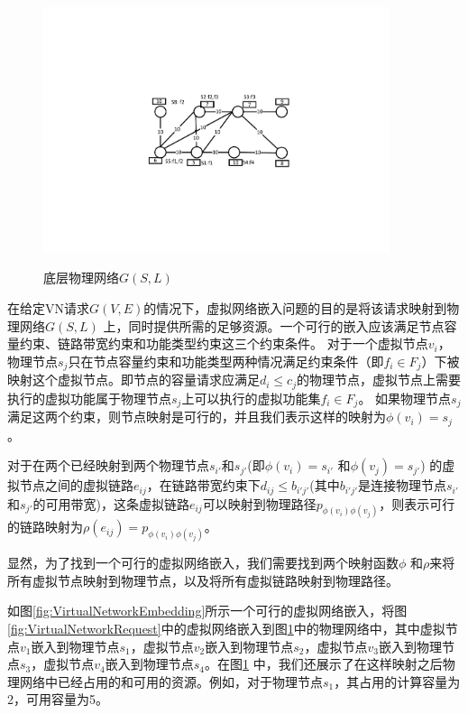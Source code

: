 \begin{figure}[htb]
\centering
\includegraphics[width=4in]{figures/PhysicalNetwork}\\
\caption{底层物理网络$G(S,L)$}\label{fig:PhysicalNetwork}
\end{figure}

在给定VN请求$G (V,E)$的情况下，虚拟网络嵌入问题的目的是将该请求映射到物理网络$G (S,L)$ 上，同时提供所需的足够资源。一个可行的嵌入应该满足节点容量约束、链路带宽约束和功能类型约束这三个约束条件。
对于一个虚拟节点$v_i$，物理节点$s_j$只在节点容量约束和功能类型两种情况满足约束条件（即${f_i} \in {F_j}$）下被映射这个虚拟节点。即节点的容量请求应满足$d_i\leq c_j$的物理节点，虚拟节点上需要执行的虚拟功能属于物理节点$s_j$上可以执行的虚拟功能集${f_i} \in {F_j}$。 如果物理节点$s_j$ 满足这两个约束，则节点映射是可行的，并且我们表示这样的映射为$\phi ({v_i}) = {s_j}$。

对于在两个已经映射到两个物理节点$s_{i'}$和$s_{j'}$(即$\phi({v_i}) = {s_{i'}}$ 和$\phi({v_j}) = {s_{j'}}$) 的虚拟节点之间的虚拟链路$e_{ij}$，在链路带宽约束下$d_{ij}\leq b_{i'j'}$(其中$b_{i'j'}$是连接物理节点$s_{i'}$ 和$s_{j'}$的可用带宽)，这条虚拟链路$e_{ij}$可以映射到物理路径$p_{\phi({v_i}) \phi({v_j})}$，则表示可行的链路映射为$\rho(e_{ij}) = p_{\phi({v_i}) \phi({v_j})}$。

显然，为了找到一个可行的虚拟网络嵌入，我们需要找到两个映射函数$\phi$ 和$\rho$来将所有虚拟节点映射到物理节点，以及将所有虚拟链路映射到物理路径。

如图\ref{fig:VirtualNetworkEmbedding}所示一个可行的虚拟网络嵌入，将图\ref{fig:VirtualNetworkRequest}中的虚拟网络嵌入到图\ref{fig:PhysicalNetwork}中的物理网络中，其中虚拟节点$v_1$嵌入到物理节点$s_1$，虚拟节点$v_2$嵌入到物理节点$s_2$，虚拟节点$v_3$嵌入到物理节点$s_3$，虚拟节点$v_4$嵌入到物理节点$s_4$。在图\ref{fig:PhysicalNetwork} 中，我们还展示了在这样映射之后物理网络中已经占用的和可用的资源。例如，对于物理节点$s_1$，其占用的计算容量为2，可用容量为5。

